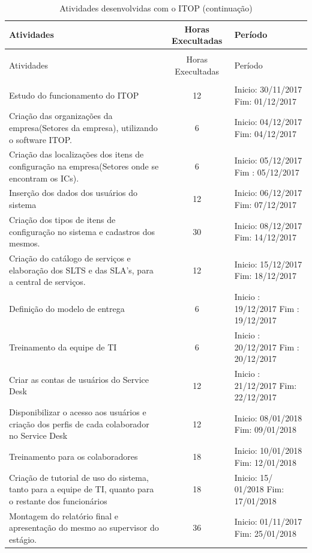 \documentclass[eso]{bcc}
\begin{document}
%
%
%

\begin{longtable}[c]{p{4.7cm}cp{2.5cm}}
  \caption{Atividades desenvolvidas com o ITOP\label{tab:atividades2}} \\
  \hline
  Atividades & Horas Execultadas & Período \\
  \hline\hline
  \endfirsthead
  \caption[]{Atividades desenvolvidas com o ITOP (continuação)} \\
  \hline
  Atividades & Horas Execultadas & Período \\
  \hline\hline
  \endhead
  \hline\hline
  \endlastfoot
  \hline
  \multicolumn{3}{r}{\footnotesize{}continua na próxima página} \\
  \endfoot
\hline
Estudo do funcionamento do ITOP & 12 & Inicio: 30/11/2017
Fim: 01/12/2017\\
\hline
Criação das organizações da empresa(Setores da empresa), utilizando o software ITOP. & 6 &Inicio: 04/12/2017
Fim: 04/12/2017\\
\hline
Criação das localizações dos itens de configuração na empresa(Setores onde se encontram os ICs). & 6 & Inicio: 05/12/2017
Fim : 05/12/2017\\
\hline
Inserção dos dados dos usuários do sistema  & 12 & Inicio: 06/12/2017
Fim: 07/12/2017\\
\hline
Criação dos tipos de itens de configuração no sistema e cadastros dos mesmos. & 30 & Inicio: 08/12/2017
Fim: 14/12/2017\\
\hline
Criação do catálogo de serviços  e elaboração dos SLTS e das SLA’s, para a central de serviços. & 12 & Inicio: 15/12/2017 Fim: 18/12/2017\\
\hline
Definição do modelo de entrega & 6 & Inicio : 19/12/2017
Fim : 19/12/2017\\
\hline
Treinamento da equipe de TI & 6 & Inicio : 20/12/2017
Fim : 20/12/2017\\
\hline
Criar as contas de usuários do Service Desk & 12 & Inicio : 21/12/2017
Fim: 22/12/2017\\
\hline
Disponibilizar o acesso aos usuários e criação dos perfis de cada colaborador no  Service Desk  & 12 &  Inicio: 08/01/2018
Fim: 09/01/2018\\
\hline
Treinamento para os colaboradores & 18 & Inicio: 10/01/2018
Fim: 12/01/2018\\
\hline
Criação de tutorial de uso do sistema, tanto para a equipe de TI, quanto para o restante dos funcionários  & 18 & Inicio: 15/ 01/2018
Fim: 17/01/2018\\
\hline
Montagem do relatório final e apresentação do mesmo ao supervisor do estágio. & 36 & Inicio: 01/11/2017
Fim: 25/01/2018\\
\hline
  
 \end{longtable}
\end{document}
